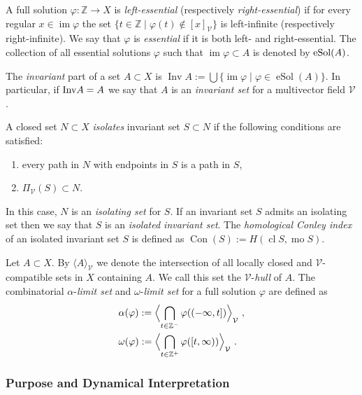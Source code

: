 \documentclass{article}
\theoremstyle{definition}
\theoremstyle{plain}
\theoremstyle{remark}
\newcommand{\1}{\mathbbm{1}}  %
\newcommand{\mo}{\operatorname{mo}}
\newcommand{\img}{\operatorname{im}}
\newcommand{\esol}{\operatorname{eSol}}
\newcommand{\Inv}{\operatorname{Inv}}
\def\cV{\text{$\mathcal V$}}
\begin{document}
A full solution $\varphi : \mathbb{Z} \rightarrow X$ is \emph{left-essential} (respectively \emph{right-essential})
if for every regular $x \in \img\varphi$ the set $\{ t \in \mathbb{Z}\mid \varphi(t) \notin [x]_{\mathcal{V}} \}$ is left-infinite (respectively right-infinite). 
We say that $\varphi$ is \emph{essential} if it is both left- and right-essential.
The collection of all essential solutions $\varphi$ such that $\img\varphi\subset A$ is denoted by $\textup{eSol}(A)$.


The \emph{invariant} part of a set $A\subset X$ is 
$\Inv A := \bigcup \{\img \varphi\mid \varphi\in\esol(A)\}$.
In particular, if $\textup{Inv} A = A$ we say that $A$ is an \emph{invariant set} for a multivector field $\mathcal{V}$. 



A closed set $N\subset X$ \emph{isolates} invariant set $S \subset N$ if the following conditions are satisfied:
\begin{enumerate}[label=(\roman*)]
    \item every path in $N$ with endpoints in $S$ is a path in $S$,
    \item $\Pi_{\mathcal{V}}(S) \subset N$.
\end{enumerate}
In this case, $N$ is an \emph{isolating set} for $S$. 
If an invariant set $S$ admits an isolating set then we say that $S$ is an \emph{isolated invariant set}.
The \emph{homological Conley index} of an isolated invariant set $S$ is defined as $\operatorname{Con}(S):=H(\operatorname{cl} S,\mo S)$.

Let $A \subset X$.
By $\bigl\langle A \bigl\rangle_{\mathcal{V}}$ we denote the intersection of 
all locally closed and $\cV$-compatible sets in $X$ containing $A$.
We call this set the $\mathcal{V}$-\emph{hull} of $A$. 
The combinatorial $\alpha$-\emph{limit set} and $\omega$-\emph{limit set} for a full solution $\varphi$ are defined as
\begin{align*}
    & \alpha(\varphi) := \Bigl\langle \bigcap\limits_{t \in \mathbb{Z}^-}\varphi((-\infty,t]) \Bigl\rangle_\mathcal{V}\ , \\
    & \omega (\varphi) := \Bigl\langle \bigcap\limits_{t \in \mathbb{Z}^+}\varphi([t, \infty))  \Bigl\rangle_\mathcal{V}\ .
\end{align*}


\subsubsection{Purpose and Dynamical Interpretation}
\end{document}
